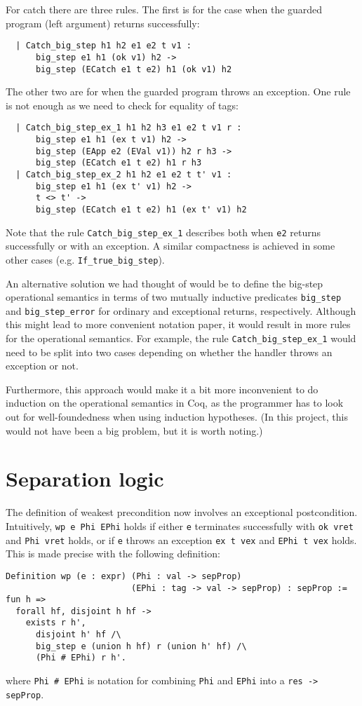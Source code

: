 \documentclass{article}
\begin{document}
For catch there are three rules. The first is for the case when the guarded program (left argument) returns successfully:
\begin{lstlisting}
  | Catch_big_step h1 h2 e1 e2 t v1 :
      big_step e1 h1 (ok v1) h2 ->
      big_step (ECatch e1 t e2) h1 (ok v1) h2
\end{lstlisting}
The other two are for when the guarded program throws an exception. One rule is not enough as we need to check for equality of tags:
\begin{lstlisting}
  | Catch_big_step_ex_1 h1 h2 h3 e1 e2 t v1 r :
      big_step e1 h1 (ex t v1) h2 ->
      big_step (EApp e2 (EVal v1)) h2 r h3 ->
      big_step (ECatch e1 t e2) h1 r h3
  | Catch_big_step_ex_2 h1 h2 e1 e2 t t' v1 :
      big_step e1 h1 (ex t' v1) h2 ->
      t <> t' ->
      big_step (ECatch e1 t e2) h1 (ex t' v1) h2
\end{lstlisting}
Note that the rule \texttt{Catch\_big\_step\_ex\_1} describes both when \texttt{e2} returns successfully or with an exception. A similar compactness is achieved
in some other cases (e.g. \texttt{If\_true\_big\_step}).

An alternative solution we had thought of would be to define the big-step operational semantics in terms of two mutually inductive predicates \texttt{big\_step}
and \texttt{big\_step\_error} for ordinary and exceptional returns, respectively. Although this might lead to more convenient notation paper,
it would result in more rules for the operational semantics. For example, the rule \texttt{Catch\_big\_step\_ex\_1} would need to be split into two cases
depending on whether the handler throws an exception or not.

Furthermore, this approach would make it a bit more inconvenient to do induction on the operational semantics in Coq, as the programmer has to look out for
well-foundedness when using induction hypotheses. (In this project, this would not have been a big problem, but it is worth noting.)

\section{Separation logic}

The definition of weakest precondition now involves an exceptional postcondition. Intuitively, \texttt{wp e Phi EPhi} holds if either \texttt{e} terminates
successfully with \texttt{ok vret} and \texttt{Phi vret} holds, or if \texttt{e} throws an exception \texttt{ex t vex} and \texttt{EPhi t vex} holds.
This is made precise with the following definition:
\begin{lstlisting}
Definition wp (e : expr) (Phi : val -> sepProp)
                         (EPhi : tag -> val -> sepProp) : sepProp := fun h =>
  forall hf, disjoint h hf ->
    exists r h',
      disjoint h' hf /\
      big_step e (union h hf) r (union h' hf) /\
      (Phi # EPhi) r h'.
\end{lstlisting}
where \texttt{Phi \# EPhi} is notation for combining \texttt{Phi} and \texttt{EPhi} into a \texttt{res -> sepProp}.
\end{document}
